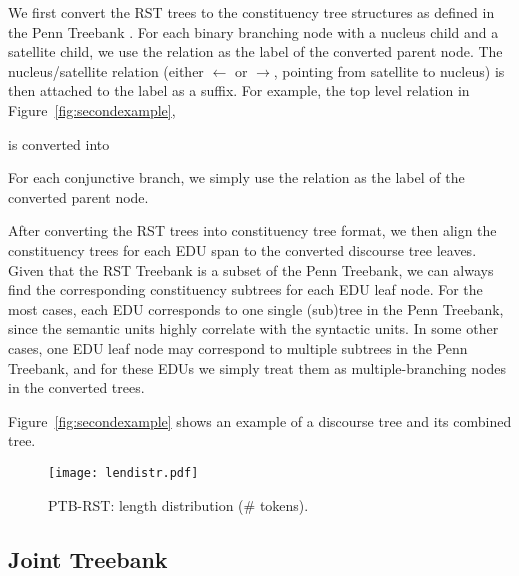 \documentclass[11pt,letterpaper]{article}
\begin{document}
We first convert the RST trees to the constituency tree structures as defined in the Penn Treebank \cite{marcus1993building}.
For each binary branching node with a nucleus child and a satellite child, we use the relation as the label of the converted
parent node. The nucleus/satellite relation 
(either $\leftarrow$ or $\rightarrow$, pointing from satellite to nucleus) 
is then attached to the label as a suffix.
For example, the top level relation in Figure~\ref{fig:secondexample},
\begin{center}
\end{center}
is converted into
\begin{center}
\end{center}
For each conjunctive branch, we simply use the relation as the label of the converted parent node. 

After converting the RST trees into constituency tree format, we then align the constituency trees for each EDU span to the converted 
discourse tree leaves. Given that the RST Treebank \cite{marcu2000theory} is a subset of the Penn Treebank,
we can always find the corresponding constituency subtrees for each EDU leaf node.
For the most cases, each EDU corresponds to one single (sub)tree in the Penn Treebank, since the semantic units 
highly correlate with the syntactic units. 
In some other cases, one EDU leaf node may correspond to multiple subtrees in the Penn Treebank,
and for these EDUs we simply treat them as multiple-branching nodes in the converted trees.

Figure~\ref{fig:secondexample} shows an example of a discourse tree and its combined tree.


\begin{figure}
\centering
\texttt{[image: lendistr.pdf]}\\[-0.3cm]
\caption{PTB-RST: length distribution (\# tokens).\label{fig:treelen}}
\end{figure}


\subsection{Joint Treebank}
\end{document}
